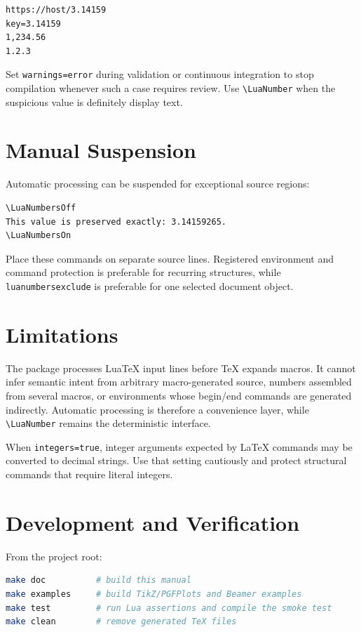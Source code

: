 \documentclass[11pt]{article}
\begin{document}
\LuaNumbersOff
\begin{lstlisting}[style=latexinput,numbers=none]
https://host/3.14159
key=3.14159
1,234.56
1.2.3
\end{lstlisting}
\LuaNumbersOn

Set \texttt{warnings=error} during validation or continuous integration to stop
compilation whenever such a case requires review. Use \verb|\LuaNumber| when
the suspicious value is definitely display text.

\section{Manual Suspension}

Automatic processing can be suspended for exceptional source regions:

\begin{lstlisting}[style=latexinput]
\LuaNumbersOff
This value is preserved exactly: 3.14159265.
\LuaNumbersOn
\end{lstlisting}

Place these commands on separate source lines. Registered environment and
command protection is preferable for recurring structures, while
\texttt{luanumbersexclude} is preferable for one selected document object.

\section{Limitations}

The package processes LuaTeX input lines before TeX expands macros. It cannot
infer semantic intent from arbitrary macro-generated source, numbers assembled
from several macros, or environments whose begin/end commands are generated
indirectly. Automatic processing is therefore a convenience layer, while
\verb|\LuaNumber| remains the deterministic interface.

When \texttt{integers=true}, integer arguments expected by LaTeX commands may
be converted to decimal strings. Use that setting cautiously and protect
structural commands that require literal integers.

\section{Development and Verification}

From the project root:

\begin{lstlisting}[style=latexinput,language=bash,numbers=none]
make doc          # build this manual
make examples     # build TikZ/PGFPlots and Beamer examples
make test         # run Lua assertions and compile the smoke test
make clean        # remove generated TeX files
\end{lstlisting}
\end{document}
